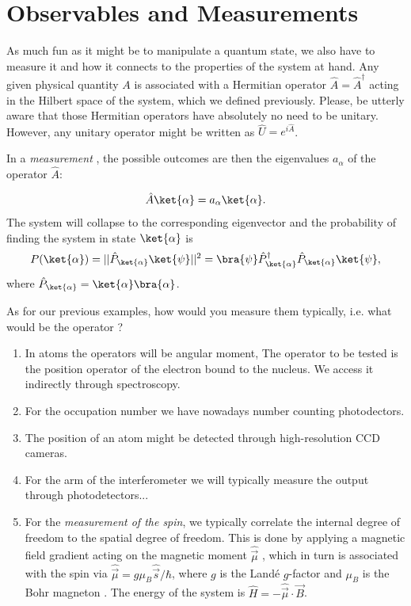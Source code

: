 \section{Observables and Measurements}
As much fun as it might be to manipulate a quantum state, we also have to measure it and how it connects to the properties of the system at hand. Any given physical quantity $A$ is associated with a Hermitian operator $\hat{A} = \hat{A}^\dag$ acting in the Hilbert space of the system, which we defined previously. Please, be utterly aware that those Hermitian operators have absolutely no need to be unitary. However, any unitary operator might be written as $\hat{U}= e^{i\hat{A}}$.

In a \emph{measurement} , the possible outcomes are then the eigenvalues $a_\alpha$  of the operator $\hat{A}$:

\begin{align}
	\hat{A}\ket{\alpha}=a_{\alpha}\ket{\alpha}.
\end{align}
The system will collapse to the corresponding eigenvector and the probability of finding the system in state $\ket{\alpha}$ is
\begin{align}
	P(\ket{\alpha})=||\hat{P}_{\ket{\alpha}} \ket{\psi}||^2 = \bra{\psi} \hat{P}^{\dag}_{\ket{\alpha}} \hat{P}_{\ket{\alpha}} \ket{\psi},
\end{align}
where $\hat{P}_{\ket{\alpha}}= \ket{\alpha} \bra{\alpha}$.

As for our previous examples, how would you measure them typically, i.e. what would be the operator ?
\begin{enumerate}
\item In atoms the operators will be angular moment, The operator to be tested is the position operator of the electron bound to the nucleus. We access it indirectly through spectroscopy.
\item For the occupation number we have nowadays number counting photodectors.
\item The position of an atom might be detected through high-resolution CCD cameras.
\item For the arm of the interferometer we will typically measure the output through photodetectors...
\item For the \textit{measurement of the spin}, we typically correlate the internal degree of freedom to the spatial degree of freedom. This is done by applying a magnetic field gradient acting on the magnetic moment $\hat{\vec{\mu}}$ , which in turn is associated with the spin via $\hat{\vec{\mu}} = g \mu_B \hat{\vec{s}}/\hbar$, where $g$ is the Landé $g$-factor  and $\mu_B$ is the Bohr magneton . The energy of the system is $\hat{H} = -\hat{\vec{\mu}} \cdot \vec{B}$.
\end{enumerate}